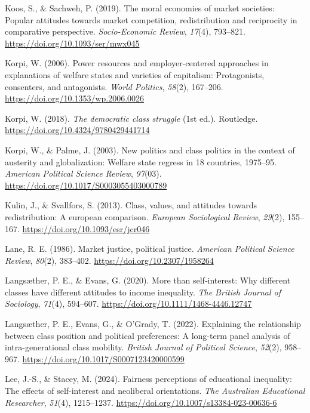 \documentclass[
  12pt,
]{article}
\newlength{\cslhangindent}
\newenvironment{CSLReferences}[2] %
 {\begin{list}{}{%
  \setlength{\itemindent}{0pt}
  \setlength{\leftmargin}{0pt}
  \setlength{\parsep}{0pt}
  \ifodd #1
   \setlength{\leftmargin}{\cslhangindent}
   \setlength{\itemindent}{-1\cslhangindent}
  \fi
  \setlength{\itemsep}{#2\baselineskip}}}
 {\end{list}}
\begin{document}
\begin{CSLReferences}{1}{0}
Koos, S., \& Sachweh, P. (2019). The moral economies of market
societies: Popular attitudes towards market competition, redistribution
and reciprocity in comparative perspective. \emph{Socio-Economic
Review}, \emph{17}(4), 793--821.
\url{https://doi.org/10.1093/ser/mwx045}

Korpi, W. (2006). Power resources and employer-centered approaches in
explanations of welfare states and varieties of capitalism:
Protagonists, consenters, and antagonists. \emph{World Politics},
\emph{58}(2), 167--206. \url{https://doi.org/10.1353/wp.2006.0026}

Korpi, W. (2018). \emph{The democratic class struggle} (1st ed.).
Routledge. \url{https://doi.org/10.4324/9780429441714}

Korpi, W., \& Palme, J. (2003). New politics and class politics in the
context of austerity and globalization: Welfare state regress in 18
countries, 1975--95. \emph{American Political Science Review},
\emph{97}(03). \url{https://doi.org/10.1017/S0003055403000789}

Kulin, J., \& Svallfors, S. (2013). Class, values, and attitudes towards
redistribution: A european comparison. \emph{European Sociological
Review}, \emph{29}(2), 155--167.
\url{https://doi.org/10.1093/esr/jcr046}

Lane, R. E. (1986). Market justice, political justice. \emph{American
Political Science Review}, \emph{80}(2), 383--402.
\url{https://doi.org/10.2307/1958264}

Langsæther, P. E., \& Evans, G. (2020). More than self‐interest: Why
different classes have different attitudes to income inequality.
\emph{The British Journal of Sociology}, \emph{71}(4), 594--607.
\url{https://doi.org/10.1111/1468-4446.12747}

Langsæther, P. E., Evans, G., \& O'Grady, T. (2022). Explaining the
relationship between class position and political preferences: A
long-term panel analysis of intra-generational class mobility.
\emph{British Journal of Political Science}, \emph{52}(2), 958--967.
\url{https://doi.org/10.1017/S0007123420000599}

Lee, J.-S., \& Stacey, M. (2024). Fairness perceptions of educational
inequality: The effects of self-interest and neoliberal orientations.
\emph{The Australian Educational Researcher}, \emph{51}(4), 1215--1237.
\url{https://doi.org/10.1007/s13384-023-00636-6}


\end{CSLReferences}
\end{document}
